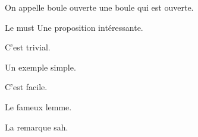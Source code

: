\documentclass[a4paper, 12pt]{article}
\begin{document}
\begin{definition}
    On appelle boule ouverte une boule qui est ouverte.
\end{definition}

\begin{proposition}{Le must}{}
    Une proposition intéressante.
\end{proposition}

\begin{demonstration}
    C'est trivial.
\end{demonstration}

\begin{exemple}
    Un exemple simple.
\end{exemple}

\begin{methode}
    C'est facile.
\end{methode}

\begin{lemme}{}{}
    Le fameux lemme.
\end{lemme}

\begin{remarque}
    La remarque sah.
\end{remarque}
\end{document}
